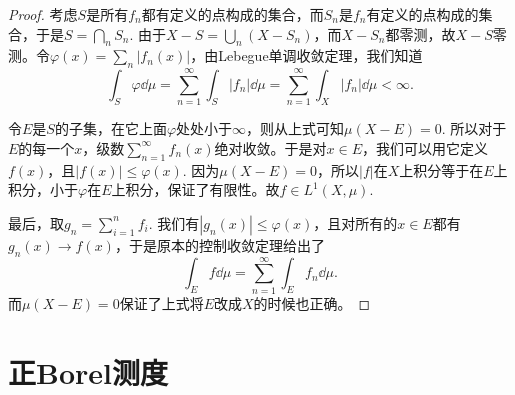 \begin{proof}
考虑$S$是所有$f_n$都有定义的点构成的集合，而$S_n$是$f_n$有定义的点构成的集合，于是$S=\bigcap_n S_n$. 由于$X-S=\bigcup_n (X-S_n)$，而$X-S_n$都零测，故$X-S$零测。令$\varphi(x)=\sum_n |f_n(x)|$，由Lebegue单调收敛定理，我们知道
\[
	\int_S \varphi \dd \mu=\sum_{n=1}^\infty\int_S |f_n|\dd \mu=\sum_{n=1}^\infty\int_X |f_n|\dd \mu<\infty.
\]

令$E$是$S$的子集，在它上面$\varphi$处处小于$\infty$，则从上式可知$\mu(X-E)=0$. 所以对于$E$的每一个$x$，级数$\sum_{n=1}^\infty f_n(x)$绝对收敛。于是对$x\in E$，我们可以用它定义$f(x)$，且$|f(x)|\leq \varphi(x)$. 因为$\mu(X-E)=0$，所以$|f|$在$X$上积分等于在$E$上积分，小于$\varphi$在$E$上积分，保证了有限性。故$f\in L^1(X,\mu)$.

最后，取$g_n=\sum_{i=1}^n f_i$. 我们有$|g_n(x)|\leq \varphi(x)$，且对所有的$x\in E$都有$g_n(x)\to f(x)$，于是原本的控制收敛定理给出了
\[
	\int_E f\dd \mu=\sum_{n=1}^\infty\int_E f_n\dd \mu.
\]
而$\mu(X-E)=0$保证了上式将$E$改成$X$的时候也正确。
\end{proof}

\section{正Borel测度}
